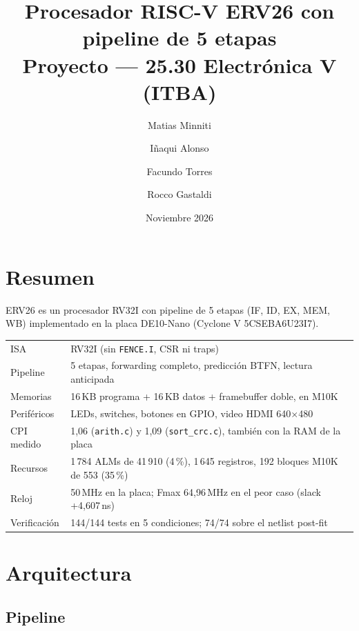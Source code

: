 \documentclass[11pt,a4paper]{article}
\title{\textbf{Procesador RISC-V ERV26 con pipeline de 5 etapas}\\[2pt]
\large Proyecto \code{risvV\_E5} --- 25.30 Electrónica V (ITBA)}
\author{Matias Minniti \and Iñaqui Alonso \and Facundo Torres \and Rocco Gastaldi}
\date{Noviembre 2026}
\newcommand{\code}[1]{\texttt{#1}}
\begin{document}
\maketitle

\section{Resumen}

ERV26 es un procesador RV32I con pipeline de 5 etapas (IF, ID, EX, MEM, WB) implementado en la placa DE10-Nano (Cyclone V 5CSEBA6U23I7). 

\begin{center}
\begin{tabular}{ll}
\toprule
ISA & RV32I (sin \code{FENCE.I}, CSR ni traps) \\
Pipeline & 5 etapas, forwarding completo, predicción BTFN, lectura anticipada \\
Memorias & 16\,KB programa + 16\,KB datos + framebuffer doble, en M10K \\
Periféricos & LEDs, switches, botones en GPIO, video HDMI 640$\times$480 \\
CPI medido & 1,06 (\code{arith.c}) y 1,09 (\code{sort\_crc.c}), también con la RAM de la placa \\
Recursos & 1\,784 ALMs de 41\,910 (4\,\%), 1\,645 registros, 192 bloques M10K de 553 (35\,\%) \\
Reloj & 50\,MHz en la placa; Fmax 64,96\,MHz en el peor caso (slack +4,607\,ns) \\
Verificación & 144/144 tests en 5 condiciones; 74/74 sobre el netlist post-fit \\
\bottomrule
\end{tabular}
\end{center}

\section{Arquitectura}

\subsection{Pipeline}
\end{document}
